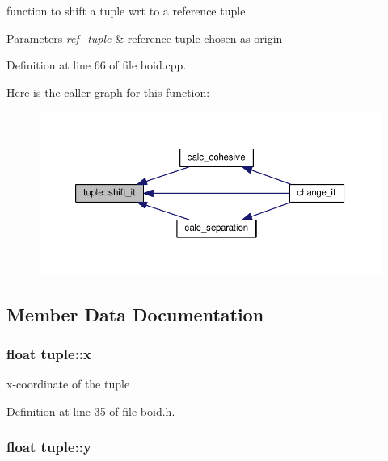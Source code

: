 function to shift a tuple wrt to a reference tuple 


\begin{DoxyParams}{Parameters}
{\em ref\+\_\+tuple} & reference tuple chosen as origin \\
\hline
\end{DoxyParams}


Definition at line 66 of file boid.\+cpp.



Here is the caller graph for this function\+:
\nopagebreak
\begin{figure}[H]
\begin{center}
\leavevmode
\includegraphics[width=350pt]{classtuple_a83e59acf101fea3b456df1315b04e4b8_icgraph}
\end{center}
\end{figure}




\subsection{Member Data Documentation}
\subsubsection[{\texorpdfstring{x}{x}}]{\setlength{\rightskip}{0pt plus 5cm}float tuple\+::x}\hypertarget{classtuple_aa2a27c2f1604d90a8d9f8f786238d29a}{}\label{classtuple_aa2a27c2f1604d90a8d9f8f786238d29a}


x-\/coordinate of the tuple 



Definition at line 35 of file boid.\+h.

\subsubsection[{\texorpdfstring{y}{y}}]{\setlength{\rightskip}{0pt plus 5cm}float tuple\+::y}\hypertarget{classtuple_a7ca83d8377715732d23975e01bf317ec}{}\label{classtuple_a7ca83d8377715732d23975e01bf317ec}


